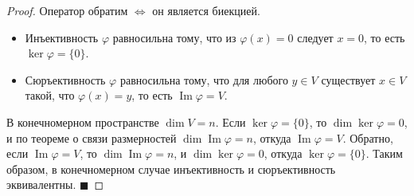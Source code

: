 \begin{proof}
Оператор обратим $\iff$ он является биекцией.
\begin{itemize}
    \item Инъективность $\varphi$ равносильна тому, что из $\varphi(x) = 0$ следует $x = 0$, то есть $\ker \varphi = \{0\}$.
    \item Сюръективность $\varphi$ равносильна тому, что для любого $y \in V$ существует $x \in V$ такой, что $\varphi(x) = y$, то есть $\operatorname{Im} \varphi = V$.
\end{itemize}
В конечномерном пространстве $\dim V = n$. Если $\ker \varphi = \{0\}$, то $\dim \ker \varphi = 0$, и по теореме о связи размерностей $\dim \operatorname{Im} \varphi = n$, откуда $\operatorname{Im} \varphi = V$. Обратно, если $\operatorname{Im} \varphi = V$, то $\dim \operatorname{Im} \varphi = n$, и $\dim \ker \varphi = 0$, откуда $\ker \varphi = \{0\}$. Таким образом, в конечномерном случае инъективность и сюръективность эквивалентны.
\hfill$\blacksquare$
\end{proof}
